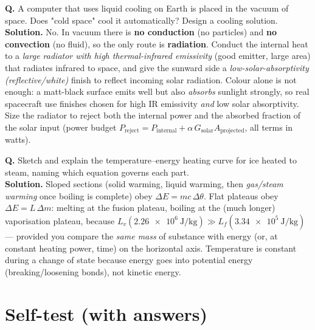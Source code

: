 \documentclass[11pt,a4paper]{article}
\newcommand{\dtheta}{\Delta\theta}
\newcommand{\dE}{\Delta E}
\begin{document}
\begin{keybox}
\textbf{Q.} A computer that uses liquid cooling on Earth is placed in the vacuum of space.
Does "cold space" cool it automatically? Design a cooling solution. \\
\textbf{Solution.} No. In vacuum there is \textbf{no conduction} (no particles) and
\textbf{no convection} (no fluid), so the only route is \textbf{radiation}. Conduct the
internal heat to a \emph{large radiator with high thermal-infrared emissivity} (good
emitter, large area) that radiates infrared to space, and give the sunward side a
\emph{low-solar-absorptivity (reflective/white)} finish to reflect incoming solar radiation.
Colour alone is not enough: a matt-black surface emits well but also \emph{absorbs} sunlight
strongly, so real spacecraft use finishes chosen for high IR emissivity \emph{and} low solar
absorptivity. Size the radiator to reject both the internal power and the absorbed fraction
of the solar input (power budget $P_{\text{reject}} = P_{\text{internal}} + \alpha\,
G_{\text{solar}} A_{\text{projected}}$, all terms in watts).
\end{keybox}

\begin{keybox}
\textbf{Q.} Sketch and explain the temperature--energy heating curve for ice heated to
steam, naming which equation governs each part. \\
\textbf{Solution.} Sloped sections (solid warming, liquid warming, then \emph{gas/steam
warming} once boiling is complete) obey $\dE = mc\,\dtheta$. Flat plateaus obey
$\dE = L\,\Delta m$: melting at the fusion plateau, boiling at the (much longer)
vaporisation plateau, because
$L_v(\SI{2.26e6}{\joule\per\kilogram}) \gg L_f(\SI{3.34e5}{\joule\per\kilogram})$ ---
provided you compare the \emph{same mass} of substance with energy (or, at constant heating
power, time) on the horizontal axis. Temperature is constant during a change of state
because energy goes into potential energy (breaking/loosening bonds), not kinetic energy.
\end{keybox}

\clearpage
\section{Self-test (with answers)}
\end{document}
